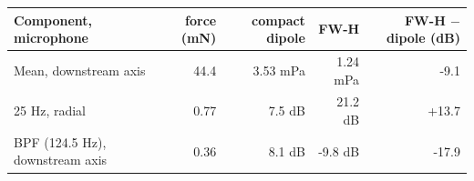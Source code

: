 \begin{tabular}{lrrrr}
\toprule
Component, microphone & force (mN) & compact dipole & FW-H & FW-H $-$ dipole (dB) \\
\midrule
Mean, downstream axis & 44.4 & 3.53 mPa & 1.24 mPa & -9.1 \\
25 Hz, radial & 0.77 & 7.5 dB & 21.2 dB & +13.7 \\
BPF (124.5 Hz), downstream axis & 0.36 & 8.1 dB & -9.8 dB & -17.9 \\
\bottomrule
\end{tabular}
